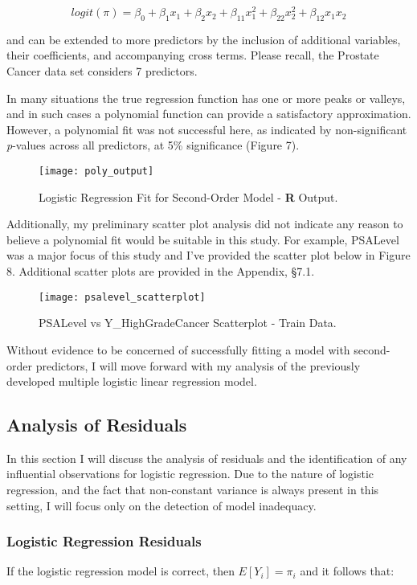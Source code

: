 \begin{equation}
logit(\pi) = \beta_0 + \beta_1x_1 + \beta_2x_2 + \beta_{11}x_1^2 + \beta_{22}x_2^2 + \beta_{12}x_1x_2
\end{equation}

\noindent and can be extended to more predictors by the inclusion of additional variables, their coefficients, and accompanying cross terms. Please recall, the Prostate Cancer data set considers 7 predictors. \par
In many situations the true regression function has one or more peaks or valleys, and in such cases a polynomial function can provide a satisfactory approximation. However, a polynomial fit was not successful here, as indicated by non-significant \textit{p}-values across all predictors, at 5\% significance (Figure 7). 

\begin{figure}[H]
	\centering
	\texttt{[image: poly\_output]}
	\caption{Logistic Regression Fit for Second-Order Model - \textbf{R} Output.}
\end{figure}

Additionally, my preliminary scatter plot analysis did not indicate any reason to believe a polynomial fit would be suitable in this study. For example, PSALevel was a major focus of this study and I've provided the scatter plot below in Figure 8. Additional scatter plots are provided in the Appendix, \S7.1.

\begin{figure}[H]
	\centering
	\texttt{[image: psalevel\_scatterplot]}
	\caption{PSALevel vs Y\_HighGradeCancer Scatterplot - Train Data.}
\end{figure}

Without evidence to be concerned of successfully fitting a model with second-order predictors, I will move forward with my analysis of the previously developed multiple logistic linear regression model.


\subsection{Analysis of Residuals}
In this section I will discuss the analysis of residuals and the identification of any influential observations for logistic regression. Due to the nature of logistic regression, and the fact that non-constant variance is always present in this setting, I will focus only on the detection of model inadequacy.

\pagebreak
\subsubsection{Logistic Regression Residuals}
If the logistic regression model is correct, then \(E[Y_i]=\pi_i\) and it follows that:

